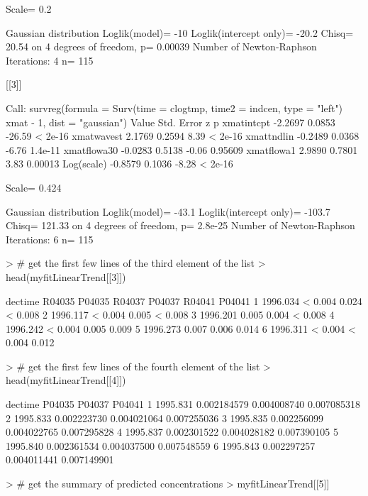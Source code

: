 \documentclass[11pt]{article}
\begin{document}
\begin{Schunk}
\begin{Soutput}
Scale= 0.2 

Gaussian distribution
Loglik(model)= -10   Loglik(intercept only)= -20.2
	Chisq= 20.54 on 4 degrees of freedom, p= 0.00039 
Number of Newton-Raphson Iterations: 4 
n= 115 


[[3]]

Call:
survreg(formula = Surv(time = clogtmp, time2 = indcen, type = "left") ~ 
    xmat - 1, dist = "gaussian")
              Value Std. Error      z       p
xmatintcpt  -2.2697     0.0853 -26.59 < 2e-16
xmatwavest   2.1769     0.2594   8.39 < 2e-16
xmattndlin  -0.2489     0.0368  -6.76 1.4e-11
xmatflowa30 -0.0283     0.5138  -0.06 0.95609
xmatflowa1   2.9890     0.7801   3.83 0.00013
Log(scale)  -0.8579     0.1036  -8.28 < 2e-16

Scale= 0.424 

Gaussian distribution
Loglik(model)= -43.1   Loglik(intercept only)= -103.7
	Chisq= 121.33 on 4 degrees of freedom, p= 2.8e-25 
Number of Newton-Raphson Iterations: 6 
n= 115 
\end{Soutput}
\begin{Sinput}
> # get the first few lines of the third element of the list
> head(myfitLinearTrend[[3]])
\end{Sinput}
\begin{Soutput}
   dectime R04035 P04035 R04037 P04037 R04041 P04041
1 1996.034      <  0.004         0.024      <  0.008
2 1996.117      <  0.004         0.005      <  0.008
3 1996.201         0.005         0.004      <  0.008
4 1996.242      <  0.004         0.005         0.009
5 1996.273         0.007         0.006         0.014
6 1996.311      <  0.004      <  0.004         0.012
\end{Soutput}
\begin{Sinput}
> # get the first few lines of the fourth element of the list
> head(myfitLinearTrend[[4]])
\end{Sinput}
\begin{Soutput}
   dectime      P04035      P04037      P04041
1 1995.831 0.002184579 0.004008740 0.007085318
2 1995.833 0.002223730 0.004021064 0.007255036
3 1995.835 0.002256099 0.004022765 0.007295828
4 1995.837 0.002301522 0.004028182 0.007390105
5 1995.840 0.002361534 0.004037500 0.007548559
6 1995.843 0.002297257 0.004011441 0.007149901
\end{Soutput}
\begin{Sinput}
> # get the summary of predicted concentrations
> myfitLinearTrend[[5]]
\end{Sinput}
\begin{Soutput}

\end{Soutput}
\end{Schunk}
\end{document}
